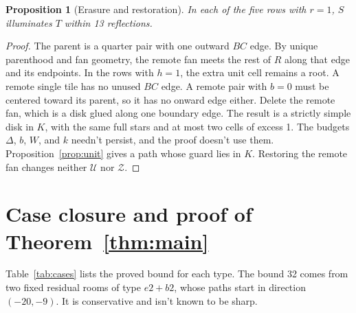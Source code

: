 \documentclass[11pt]{article}
\newtheorem{proposition}{Proposition}
\theoremstyle{remark}
\begin{document}
\begin{proposition}[Erasure and restoration]\label{prop:erasure}
In each of the five rows with $r=1$, $S$ illuminates $T$ within 13 reflections.
\end{proposition}
\begin{proof}
The parent is a quarter pair with one outward $BC$ edge. By unique parenthood and fan geometry, the remote fan meets the rest of $R$ along that edge and its endpoints. In the rows with $h=1$, the extra unit cell remains a root. A remote single tile has no unused $BC$ edge. A remote pair with $b=0$ must be centered toward its parent, so it has no onward edge either. Delete the remote fan, which is a disk glued along one boundary edge. The result is a strictly simple disk in $K$, with the same full stars and at most two cells of excess 1. The budgets $\Delta$, $b$, $W$, and $k$ needn't persist, and the proof doesn't use them. Proposition~\ref{prop:unit} gives a path whose guard lies in $K$. Restoring the remote fan changes neither $\mathcal U$ nor $\mathcal Z$.
\end{proof}

\section{Case closure and proof of Theorem~\ref{thm:main}}\label{sec:closure}
Table~\ref{tab:cases} lists the proved bound for each type. The bound 32 comes from two fixed residual rooms of type $e2{+}b2$, whose paths start in direction $(-20,-9)$. It is conservative and isn't known to be sharp.
\end{document}
